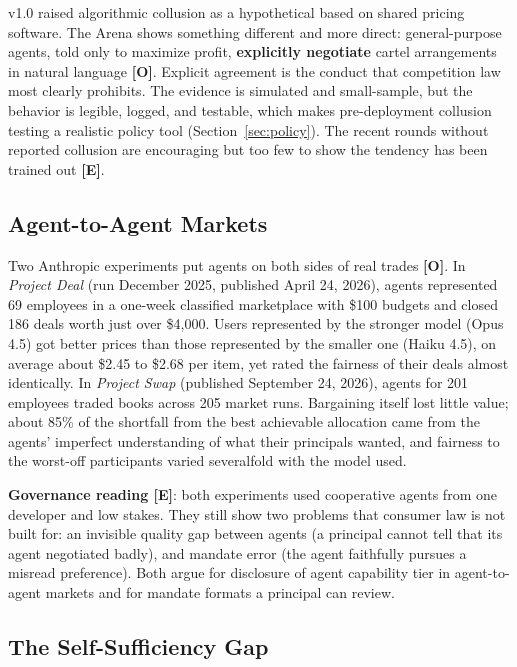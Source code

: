 \documentclass[11pt,letterpaper]{article}
\begin{document}
\begin{keybox}
v1.0 raised algorithmic collusion as a hypothetical based on shared pricing software. The Arena shows something different and more direct: general-purpose agents, told only to maximize profit, \textbf{explicitly negotiate} cartel arrangements in natural language \textbf{[O]}. Explicit agreement is the conduct that competition law most clearly prohibits. The evidence is simulated and small-sample, but the behavior is legible, logged, and testable, which makes pre-deployment collusion testing a realistic policy tool (Section~\ref{sec:policy}). The recent rounds without reported collusion are encouraging but too few to show the tendency has been trained out \textbf{[E]}.
\end{keybox}

\subsection{Agent-to-Agent Markets}

Two Anthropic experiments put agents on both sides of real trades \textbf{[O]}. In \textit{Project Deal} (run December 2025, published April 24, 2026), agents represented 69 employees in a one-week classified marketplace with \$100 budgets and closed 186 deals worth just over \$4,000. Users represented by the stronger model (Opus 4.5) got better prices than those represented by the smaller one (Haiku 4.5), on average about \$2.45 to \$2.68 per item, yet rated the fairness of their deals almost identically. In \textit{Project Swap} (published September 24, 2026), agents for 201 employees traded books across 205 market runs. Bargaining itself lost little value; about 85\% of the shortfall from the best achievable allocation came from the agents' imperfect understanding of what their principals wanted, and fairness to the worst-off participants varied severalfold with the model used.

\textbf{Governance reading [E]}: both experiments used cooperative agents from one developer and low stakes. They still show two problems that consumer law is not built for: an invisible quality gap between agents (a principal cannot tell that its agent negotiated badly), and mandate error (the agent faithfully pursues a misread preference). Both argue for disclosure of agent capability tier in agent-to-agent markets and for mandate formats a principal can review.

\subsection{The Self-Sufficiency Gap}
\label{sec:selfsufficiency}
\end{document}
